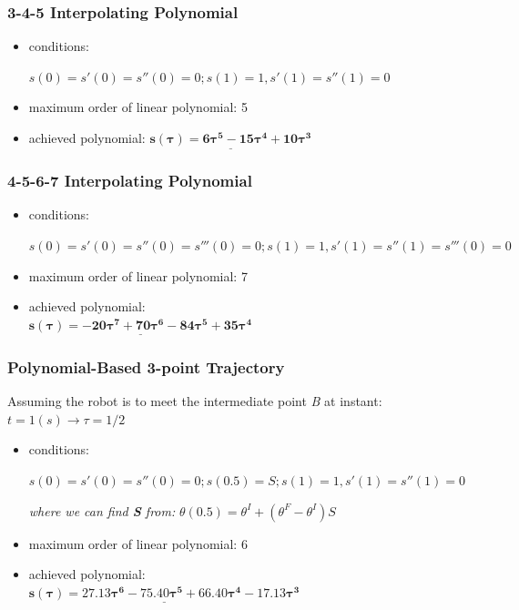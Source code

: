 \documentclass[conference]{IEEEtran}
\begin{document}
\vspace{11px}

\subsubsection{\textbf{3-4-5 Interpolating Polynomial}}
\begin{itemize}
    \item conditions: \begin{footnotesize}\(s(0) = s'(0) = s''(0) = 0; s(1) = 1, s'(1) = s''(1) = 0\) \end{footnotesize}
    \item maximum order of linear polynomial: 5
    \item achieved polynomial: \(\underline{\mathbf{s(\tau) = 6\tau^5 - 15\tau^4 + 10\tau^3}}\)
\end{itemize}

\vspace{11px}

\subsubsection{\textbf{4-5-6-7 Interpolating Polynomial}}
\begin{itemize} %
    \item conditions: \begin{footnotesize}\(s(0) = s'(0) = s''(0) = s'''(0) = 0; s(1) = 1, s'(1) = s''(1) = s'''(0) = 0\) \end{footnotesize}
    \item maximum order of linear polynomial: 7
    \item achieved polynomial: \\
          \(\underline{\mathbf{s(\tau) = -20\tau^7 + 70\tau^6 - 84\tau^5 + 35\tau^4}}\)
\end{itemize}

\vspace{11px}

\subsubsection{\textbf{Polynomial-Based 3-point Trajectory}}
Assuming the robot is to meet the intermediate point \textit{B} at instant: \\
\(t=1(s) \rightarrow \tau = 1/2\)

\begin{itemize}
    \item  conditions: \begin{footnotesize}
              \(s(0) = s'(0) = s''(0) = 0; s(0.5) = S; s(1) = 1, s'(1) = s''(1) = 0\)
          \end{footnotesize}
          \textit{where we can find \textbf{S} from:} \(\theta(0.5) = \theta^I + \left(\theta^F - \theta^I\right) S \)
    \item maximum order of linear polynomial: 6
    \item achieved polynomial: \\
          \(\underline{\mathbf{s(\tau) = 27.13\tau^6 - 75.40\tau^5 + 66.40\tau^4 - 17.13\tau^3}}\)
\end{itemize}
\end{document}
